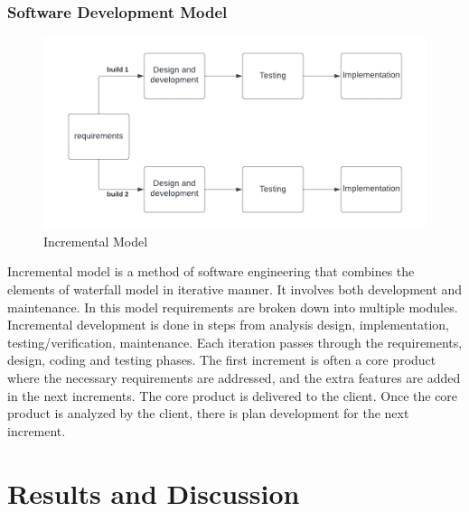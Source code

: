 \subsection{Software Development Model}
 \begin{figure}[tbh] %
\begin{center}
	\includegraphics[scale=1]{incre.png} 
	\caption{Incremental Model} %
	\label{Incremental Model} %
\end{center}
\end{figure}
 Incremental model is a method of software engineering that combines the elements of waterfall model in iterative manner. It involves both development and maintenance. In this model requirements are broken down into multiple modules. Incremental development is done in steps from analysis design, implementation, testing/verification, maintenance. Each iteration passes through the requirements, design, coding and testing phases. The first increment is often a core product where the necessary requirements are addressed, and the extra features are added in the next increments. The core product is delivered to the client. Once the core product is analyzed by the client, there is plan development for the next increment.\\
\chapter{Results and Discussion}
